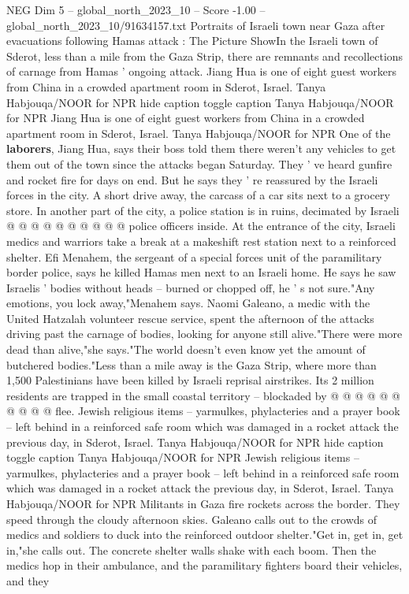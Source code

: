 \begin{textsample}{NEG Dim 5 – global\_north\_2023\_10 – Score -1.00 – global\_north\_2023\_10/91634157.txt}  \label{ex:f5_neg_023}
Portraits of Israeli town near Gaza after evacuations following Hamas attack : The Picture ShowIn the Israeli town of Sderot, less than a mile from the Gaza Strip, there are remnants and recollections of carnage from Hamas ' ongoing attack.
Jiang Hua is one of eight guest workers from China in a crowded apartment room in Sderot, Israel.
Tanya Habjouqa/NOOR for NPR hide caption toggle caption Tanya Habjouqa/NOOR for NPR Jiang Hua is one of eight guest workers from China in a crowded apartment room in Sderot, Israel.
Tanya Habjouqa/NOOR for NPR One of the \textbf{laborers}, Jiang Hua, says their boss told them there weren't any vehicles to get them out of the town since the attacks began Saturday.
They ' ve heard gunfire and rocket fire for days on end.
But he says they ' re reassured by the Israeli forces in the city.
A short drive away, the carcass of a car sits next to a grocery store.
In another part of the city, a police station is in ruins, decimated by Israeli @ @ @ @ @ @ @ @ @ @ police officers inside.
At the entrance of the city, Israeli medics and warriors take a break at a makeshift rest station next to a reinforced shelter.
Efi Menahem, the sergeant of a special forces unit of the paramilitary border police, says he killed Hamas men next to an Israeli home.
He says he saw Israelis ' bodies without heads -- burned or chopped off, he ' s not sure."Any emotions, you lock away,"Menahem says.
Naomi Galeano, a medic with the United Hatzalah volunteer rescue service, spent the afternoon of the attacks driving past the carnage of bodies, looking for anyone still alive."There were more dead than alive,"she says."The world doesn't even know yet the amount of butchered bodies."Less than a mile away is the Gaza Strip, where more than 1,500 Palestinians have been killed by Israeli reprisal airstrikes.
Its 2 million residents are trapped in the small coastal territory -- blockaded by @ @ @ @ @ @ @ @ @ @ flee.
Jewish religious items -- yarmulkes, phylacteries and a prayer book -- left behind in a reinforced safe room which was damaged in a rocket attack the previous day, in Sderot, Israel.
Tanya Habjouqa/NOOR for NPR hide caption toggle caption Tanya Habjouqa/NOOR for NPR Jewish religious items -- yarmulkes, phylacteries and a prayer book -- left behind in a reinforced safe room which was damaged in a rocket attack the previous day, in Sderot, Israel.
Tanya Habjouqa/NOOR for NPR Militants in Gaza fire rockets across the border.
They speed through the cloudy afternoon skies.
Galeano calls out to the crowds of medics and soldiers to duck into the reinforced outdoor shelter."Get in, get in, get in,"she calls out.
The concrete shelter walls shake with each boom.
Then the medics hop in their ambulance, and the paramilitary fighters board their vehicles, and they

\end{textsample}
